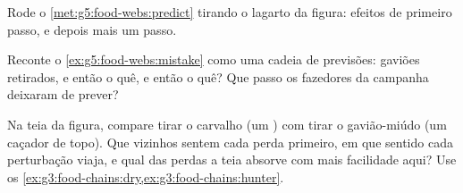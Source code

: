 \begin{exercise}[$\star\star$]\label{exo:g5:food-webs:9}
Rode o \cref{met:g5:food-webs:predict} tirando o lagarto da figura:
efeitos de primeiro passo, e depois mais um passo.
\end{exercise}

\begin{exercise}[$\star\star$]\label{exo:g5:food-webs:10}
Reconte o \cref{ex:g5:food-webs:mistake} como uma cadeia de
previsões: gaviões retirados, e então o quê, e então o quê? Que
passo os fazedores da campanha deixaram de prever?
\end{exercise}

\begin{exercise}[$\star\star\star$]\label{exo:g5:food-webs:11}
Na teia da figura, compare tirar o carvalho (um ) com tirar
o gavião-miúdo (um caçador de topo). Que vizinhos sentem cada perda
primeiro, em que sentido cada perturbação viaja, e qual das perdas a
teia absorve com mais facilidade aqui? Use os
\cref{ex:g3:food-chains:dry,ex:g3:food-chains:hunter}.
\end{exercise}
